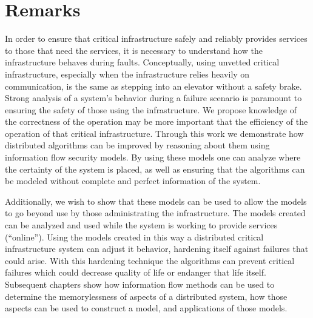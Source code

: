\section{Remarks}

In order to ensure that critical infrastructure safely and reliably provides services to those that need the services, it is necessary to understand how the infrastructure behaves during faults.
Conceptually, using unvetted critical infrastructure, especially when the infrastructure relies heavily on communication, is the same as stepping into an elevator without a safety brake.
Strong analysis of a system's behavior during a failure scenario is paramount to ensuring the safety of those using the infrastructure.
We propose knowledge of the correctness of the operation may be more important that the efficiency of the operation of that critical infrastructure.
Through this work we demonstrate how distributed algorithms can be improved by reasoning about them using information flow security models.
By using these models one can analyze where the certainty of the system is placed, as well as ensuring that the algorithms can be modeled without complete and perfect information of the system.

Additionally, we wish to show that these models can be used to allow the models to go beyond use by those administrating the infrastructure.
The models created can be analyzed and used while the system is working to provide services (``online'').
Using the models created in this way a distributed critical infrastructure system can adjust it behavior, hardening itself against failures that could arise.
With this hardening technique the algorithms can prevent critical failures which could decrease quality of life or endanger that life itself.
Subsequent chapters show how information flow methods can be used to determine the memorylessness of aspects of a distributed system, how those aspects can be used to construct a model, and applications of those models.
